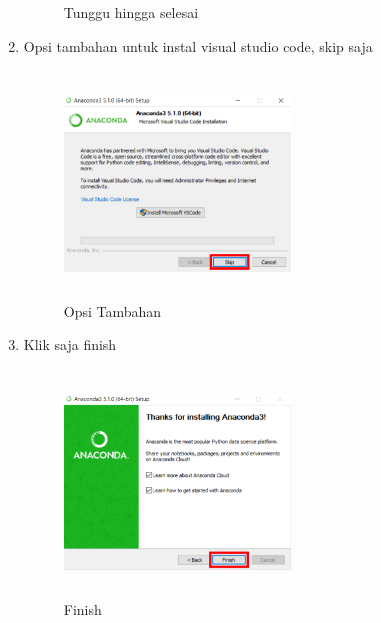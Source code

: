 \begin{enumerate}
\begin{figure}[H]
\caption{Tunggu hingga selesai}
\label{akhir}
\end{figure}
\item Opsi tambahan untuk instal visual studio code, skip saja
\begin{figure}[H]
\centering
\includegraphics[width=6cm,height=6cm]{figures/7chan.png}
\caption{Opsi Tambahan}
\label{akhir}
\end{figure}
\item Klik saja finish
\begin{figure}[H]
\centering
\includegraphics[width=6cm,height=6cm]{figures/8chan.png}
\caption{Finish}
\label{akhir}
\end{figure}
\end{enumerate}

